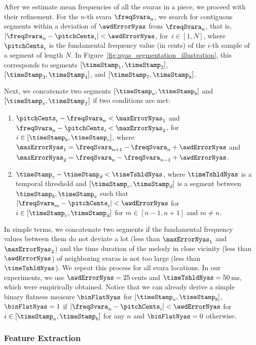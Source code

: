 {After we estimate mean frequencies of all the \glspl{svara} in a piece, we proceed with their refinement. For the $n$-th \gls{svara} $\freqSvara_n$, we search for contiguous segments within a deviation of $\awdErrorNyas$ from $\freqSvara_n$, that is, $\vert \freqSvara_n-\pitchCents_i \vert < \awdErrorNyas$, for~$i\in[1,N]$, where $\pitchCents_i$ is the fundamental frequency value (in cents) of the $i$-th sample of a segment of length $N$. In Figure~\ref{fig:nyas_segmentation_illustration}, this corresponds to segments $[\timeStamp_1,\timeStamp_2]$, $[\timeStamp_3,\timeStamp_4]$, and $[\timeStamp_7,\timeStamp_8]$.

Next, we concatenate two segments $[\timeStamp_a,\timeStamp_b]$ and $[\timeStamp_e,\timeStamp_f]$ if two conditions are met:
\begin{enumerate}
	\item $\pitchCents_i-\freqSvara_n < \maxErrorNyas_1$ and $\freqSvara_n-\pitchCents_i < \maxErrorNyas_2$, for $i\in[\timeStamp_b,\timeStamp_e]$, where $\maxErrorNyas_1 = \freqSvara_{n+1}-\freqSvara_n + \awdErrorNyas$ and $\maxErrorNyas_2 = \freqSvara_n-\freqSvara_{n-1} + \awdErrorNyas$. 
	\item $\timeStamp_c-\timeStamp_d < \timeTshldNyas$, where $\timeTshldNyas$ is a temporal threshold and $[\timeStamp_c,\timeStamp_d]$ is a segment between $\timeStamp_b, \timeStamp_e$ such that $\vert \freqSvara_m-\pitchCents_i\vert <\awdErrorNyas$ for $i\in[\timeStamp_c,\timeStamp_d]$ for $m\in [{n-1}, {n+1}]$ and $m \neq n$.
\end{enumerate}

In simple terms, we concatenate two segments if the fundamental frequency values between them do not deviate a lot (less than $\maxErrorNyas_1$ and $\maxErrorNyas_2$) and the time duration of the melody in close vicinity (less than $\awdErrorNyas$) of neighboring \glspl{svara} is not too large (less than $\timeTshldNyas$). We repeat this process for all \gls{svara} locations. In our experiments, we use $\awdErrorNyas = 25$\,cents and $\timeTshldNyas=50$\,ms, which were empirically obtained. Notice that we can already derive a simple binary flatness measure $\binFlatNyas$ for $[\timeStamp_a, \timeStamp_b]$, $\binFlatNyas=1$ if $\vert \freqSvara_n-\pitchCents_i \vert< \awdErrorNyas$ for $i \in [\timeStamp_a, \timeStamp_b]$ for any $n$ and $\binFlatNyas=0$ otherwise. 

\subsubsection{Feature Extraction}
\label{sec:pro_processing_nyas_segmentation_feature_extraction}

}
